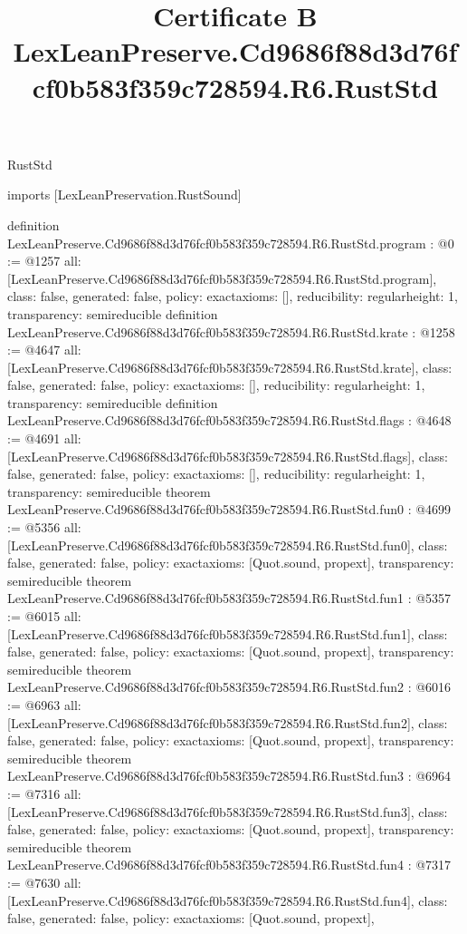 \begin{lexlean}{RustStd}
\title{Certificate B LexLeanPreserve.Cd9686f88d3d76fcf0b583f359c728594.R6.RustStd}
\begin{coremodule}
imports [LexLeanPreservation.RustSound]

definition LexLeanPreserve.Cd9686f88d3d76fcf0b583f359c728594.R6.RustStd.program : @0 := @1257 {
  all: [LexLeanPreserve.Cd9686f88d3d76fcf0b583f359c728594.R6.RustStd.program],
  class: false,
  generated: false,
  policy: exact{axioms: []},
  reducibility: regular{height: 1},
  transparency: semireducible
}
definition LexLeanPreserve.Cd9686f88d3d76fcf0b583f359c728594.R6.RustStd.krate : @1258 := @4647 {
  all: [LexLeanPreserve.Cd9686f88d3d76fcf0b583f359c728594.R6.RustStd.krate],
  class: false,
  generated: false,
  policy: exact{axioms: []},
  reducibility: regular{height: 1},
  transparency: semireducible
}
definition LexLeanPreserve.Cd9686f88d3d76fcf0b583f359c728594.R6.RustStd.flags : @4648 := @4691 {
  all: [LexLeanPreserve.Cd9686f88d3d76fcf0b583f359c728594.R6.RustStd.flags],
  class: false,
  generated: false,
  policy: exact{axioms: []},
  reducibility: regular{height: 1},
  transparency: semireducible
}
theorem LexLeanPreserve.Cd9686f88d3d76fcf0b583f359c728594.R6.RustStd.fun0 : @4699 := @5356 {
  all: [LexLeanPreserve.Cd9686f88d3d76fcf0b583f359c728594.R6.RustStd.fun0],
  class: false,
  generated: false,
  policy: exact{axioms: [Quot.sound, propext]},
  transparency: semireducible
}
theorem LexLeanPreserve.Cd9686f88d3d76fcf0b583f359c728594.R6.RustStd.fun1 : @5357 := @6015 {
  all: [LexLeanPreserve.Cd9686f88d3d76fcf0b583f359c728594.R6.RustStd.fun1],
  class: false,
  generated: false,
  policy: exact{axioms: [Quot.sound, propext]},
  transparency: semireducible
}
theorem LexLeanPreserve.Cd9686f88d3d76fcf0b583f359c728594.R6.RustStd.fun2 : @6016 := @6963 {
  all: [LexLeanPreserve.Cd9686f88d3d76fcf0b583f359c728594.R6.RustStd.fun2],
  class: false,
  generated: false,
  policy: exact{axioms: [Quot.sound, propext]},
  transparency: semireducible
}
theorem LexLeanPreserve.Cd9686f88d3d76fcf0b583f359c728594.R6.RustStd.fun3 : @6964 := @7316 {
  all: [LexLeanPreserve.Cd9686f88d3d76fcf0b583f359c728594.R6.RustStd.fun3],
  class: false,
  generated: false,
  policy: exact{axioms: [Quot.sound, propext]},
  transparency: semireducible
}
theorem LexLeanPreserve.Cd9686f88d3d76fcf0b583f359c728594.R6.RustStd.fun4 : @7317 := @7630 {
  all: [LexLeanPreserve.Cd9686f88d3d76fcf0b583f359c728594.R6.RustStd.fun4],
  class: false,
  generated: false,
  policy: exact{axioms: [Quot.sound, propext]},
}
\end{coremodule}
\end{lexlean}
